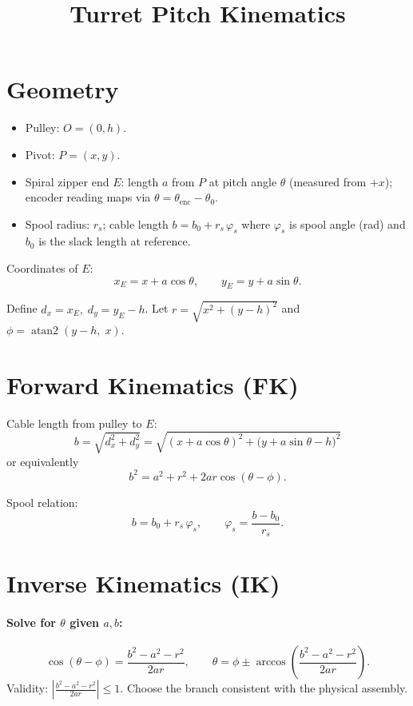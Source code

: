 \documentclass[11pt]{article}
\title{Turret Pitch Kinematics}
\author{}
\date{}
\begin{document}
\maketitle

\section*{Geometry}
\begin{itemize}
  \item Pulley: \(O = (0,h)\).
  \item Pivot: \(P = (x,y)\).
  \item Spiral zipper end \(E\): length \(a\) from \(P\) at pitch angle \(\theta\) (measured from \(+x\)); encoder reading maps via \(\theta = \theta_{\text{enc}} - \theta_0\).
  \item Spool radius: \(r_s\); cable length \(b = b_0 + r_s\,\varphi_s\) where \(\varphi_s\) is spool angle (rad) and \(b_0\) is the slack length at reference.
\end{itemize}

Coordinates of \(E\):
\[
x_E = x + a\cos\theta, \qquad y_E = y + a\sin\theta.
\]

Define \(d_x = x_E,\; d_y = y_E - h\). Let \(r = \sqrt{x^2 + (y-h)^2}\) and \(\phi = \operatorname{atan2}(y-h,\; x)\).

\section*{Forward Kinematics (FK)}
Cable length from pulley to \(E\):
\[
b = \sqrt{d_x^2 + d_y^2}
= \sqrt{(x + a\cos\theta)^2 + \bigl(y + a\sin\theta - h\bigr)^2}
\]
or equivalently
\[
b^2 = a^2 + r^2 + 2ar\cos(\theta - \phi).
\]

Spool relation:
\[
b = b_0 + r_s\,\varphi_s, \qquad \varphi_s = \frac{b - b_0}{r_s}.
\]

\section*{Inverse Kinematics (IK)}

\paragraph{Solve for \(\theta\) given \(a, b\):}
\[
\cos(\theta - \phi) = \frac{b^2 - a^2 - r^2}{2ar}, \qquad
\theta = \phi \pm \arccos\!\left(\frac{b^2 - a^2 - r^2}{2ar}\right).
\]
Validity: \(\left|\frac{b^2 - a^2 - r^2}{2ar}\right| \le 1\). Choose the branch consistent with the physical assembly.
\end{document}
